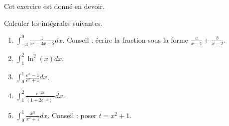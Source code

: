 
\begin{exercice}\label{exomazhe-0013}

  \begin{remark}
    Cet exercice est donné en devoir.
  \end{remark}

	Calculer les intégrales suivantes.
	
	\begin{multicols}{2}
          \begin{enumerate}
	  \item
	    $\displaystyle\int_{-3}^0\frac{1}{ x^2-3x+2 }dx$. Conseil : écrire la fraction sous la forme $\frac{ a }{ x-1 }+\frac{ b }{ x-2 }$.
	  \item
	    $\displaystyle\int_1^2\ln^2(x)dx$.
	  \item
	    $\displaystyle\int_0^1\frac{ e^x-1 }{ e^x+1 }dx$.
	  \item
	    $\displaystyle\int_1^2\frac{  e^{-2x} }{ (1+2 e^{-x})^2 }dx$.
	  \item
	    $\displaystyle\int_0^1\frac{ x^3 }{ x^2+1 }dx$. Conseil : poser $t=x^2+1$.
	  \end{enumerate}
	  
        \end{multicols}

\end{exercice}
